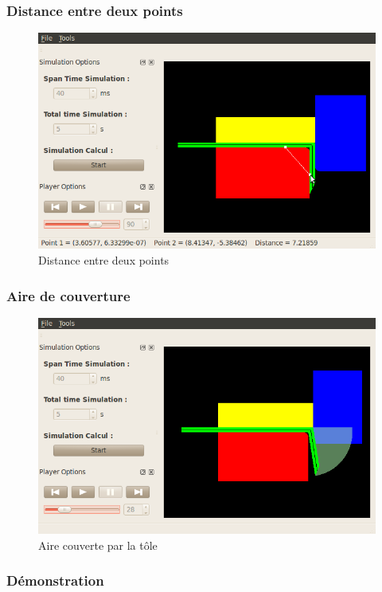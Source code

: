 \documentclass{beamer}
\begin{document}
\begin{frame}
    \frametitle{Distance entre deux points}
    \begin{figure}
        \includegraphics[width=.8\textwidth]{img/distance.png}
        \caption{Distance entre deux points}
    \end{figure}
\end{frame}
\begin{frame}
    \frametitle{Aire de couverture}
    \begin{figure}
        \includegraphics[width=.8\textwidth]{img/area.png}
        \caption{Aire couverte par la tôle}
    \end{figure}
\end{frame}
\begin{frame}
    \frametitle{Démonstration}
    \begin{center}
    \end{center}
\end{frame}
\end{document}
